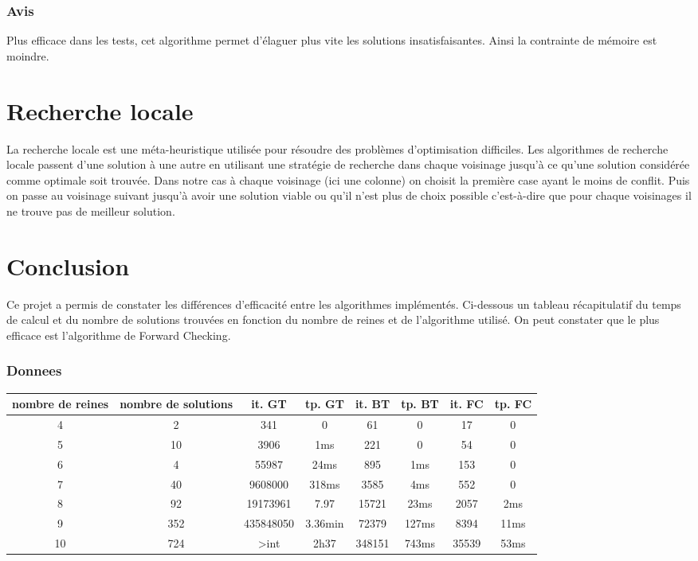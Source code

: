 \documentclass[a4paper,12pt]{report}
\begin{document}
	\subsubsection{Avis}
	Plus efficace dans les tests, cet algorithme permet d'élaguer plus vite les solutions insatisfaisantes. Ainsi la contrainte de mémoire est moindre.
	
	\section{Recherche locale}
	La recherche locale est une méta-heuristique utilisée pour résoudre des problèmes d'optimisation difficiles.  Les algorithmes de recherche locale passent d'une solution à une autre en utilisant une stratégie de recherche dans chaque voisinage jusqu'à ce qu'une solution considérée comme optimale soit trouvée. Dans notre cas à chaque voisinage (ici une colonne) on choisit la première case ayant le moins de conflit. Puis on passe au voisinage suivant jusqu'à avoir une solution viable ou qu'il n'est plus de choix possible c'est-à-dire que pour chaque voisinages il ne trouve pas de meilleur solution.
 
	\newpage	
	\section*{Conclusion}
	Ce projet a permis de constater les différences d'efficacité entre les algorithmes implémentés. Ci-dessous un tableau récapitulatif du temps de calcul et du nombre de solutions trouvées en fonction du nombre de reines et de l'algorithme utilisé. On peut constater que le plus efficace est l'algorithme de Forward Checking.
	
	\subsubsection{Donnees}
			\begin{tabular}{|c|c|c|c|c|c|c|c|}
				\hline
				nombre de reines & nombre de solutions & it. GT & tp. GT & it. BT & tp. BT & it. FC & tp. FC  \\
				\hline
				4 & 2 & 341 & 0 & 61 & 0 & 17 & 0\\
				\hline
				5 & 10 & 3906 & 1ms & 221 & 0 & 54 & 0\\
				\hline
				6 & 4 & 55987 & 24ms & 895 & 1ms & 153 & 0\\
				\hline
				7 & 40 & 9608000 & 318ms & 3585 & 4ms & 552 & 0\\
				\hline
				8 & 92 & 19173961 & 7.97 & 15721 & 23ms & 2057 & 2ms\\
				\hline
				9 & 352 & 435848050 & 3.36min & 72379 & 127ms & 8394 & 11ms\\
				\hline
				10 & 724 & >int & 2h37 & 348151 & 743ms & 35539 & 53ms\\
				\hline
				
			\end{tabular}
			
\end{document}
